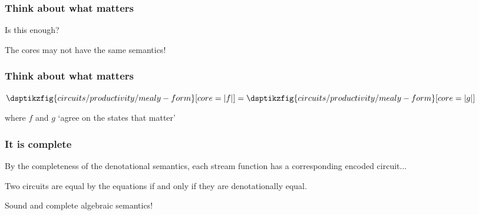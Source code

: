 \begin{frame}
    \frametitle{Think about what matters}

    \centering
    \LARGE
    Is this enough?
    \await
    \normalsize

    \vspace{1em}

    \quad

    \vspace{1em}
    \Large
    The cores may \alert{not} have the same semantics!

\end{frame}
\begin{frame}
    \frametitle{Think about what matters}

    \centering

    \(
    \dsptikzfig{circuits/productivity/mealy-form}[core=|f|]
    =
    \dsptikzfig{circuits/productivity/mealy-form}[core=|g|]
    \)

    \vspace{1em}

    \Large
    where \(f\) and \(g\) `agree on the states that matter'

\end{frame}

\begin{frame}
    \frametitle{It is complete}

    \centering
    \Large
    By the completeness of the denotational semantics, each stream function
    has a corresponding \alert{encoded} circuit...

    \await
    \vspace{1em}

    \begin{theorem}
        \centering
        Two circuits are equal by the equations if and only if they are
        denotationally equal.
    \end{theorem}

    \await

    \LARGE
    Sound and complete \alert{algebraic semantics}!

\end{frame}